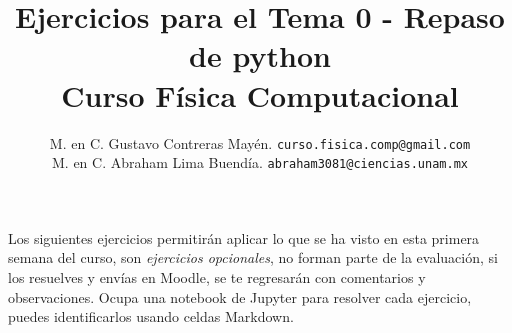 
\usepackage{minted}

\author{M. en C. Gustavo Contreras Mayén. \texttt{curso.fisica.comp@gmail.com}\\
M. en C. Abraham Lima Buendía. \texttt{abraham3081@ciencias.unam.mx}}
\title{Ejercicios para el Tema 0 - Repaso de python \\ {\large Curso Física Computacional}}
\date{ }


\maketitle
\fontsize{12}{12}\selectfont

Los siguientes ejercicios permitirán aplicar lo que se ha visto en esta primera semana del curso, son \emph{ejercicios opcionales}, no forman parte de la evaluación, si los resuelves y envías en Moodle, se te regresarán con comentarios y observaciones. Ocupa una notebook de Jupyter para resolver cada ejercicio, puedes identificarlos usando celdas Markdown.


